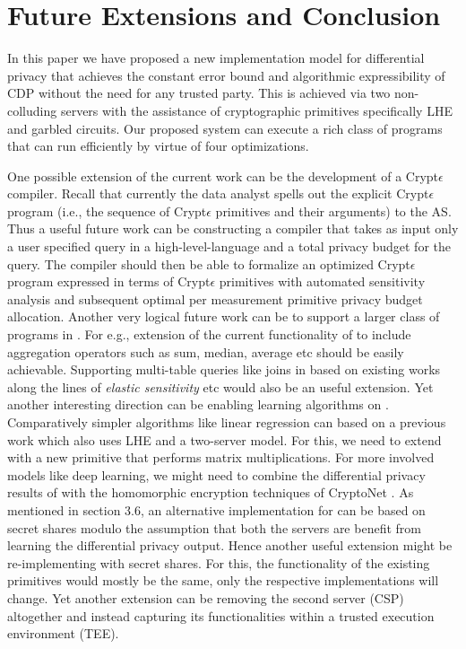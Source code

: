 
\section{Future Extensions and Conclusion}
In this paper we have proposed a new implementation model for differential privacy that achieves the constant error bound and  algorithmic expressibility of \textsf{CDP} without the need for any trusted party. This is achieved via two non-colluding servers with the assistance of cryptographic primitives specifically \textsf{LHE} and garbled circuits. Our proposed system \system can execute a rich class of programs that can run  efficiently by virtue of four optimizations.
\par  One possible extension of the current work can be the development of a
Crypt$\epsilon$ compiler. Recall that currently the data analyst spells out the explicit Crypt$\epsilon$ program  (i.e., the sequence of Crypt$\epsilon$ primitives and their arguments) to the \textsf{AS}. Thus a useful future work can be constructing a compiler that takes as input only a user specified query in a high-level-language and a total privacy budget for the query. The
compiler should then be able to formalize an optimized Crypt$\epsilon$ program expressed in terms of Crypt$\epsilon$ primitives with automated sensitivity analysis and subsequent optimal per measurement primitive privacy budget allocation. 
Another very logical future work can be to support a larger class of programs in \system. For e.g., extension of the current functionality of \system to include aggregation operators such as sum, median, average etc should be easily achievable. Supporting  multi-table queries like joins in \system based on existing works along the lines of \emph{elastic sensitivity} \cite{elastic} etc would also be an useful extension.  Yet another interesting direction can be enabling learning algorithms on \system.   Comparatively simpler algorithms like linear regression can based on a previous work \cite{LReg} which also uses \textsf{LHE} and a two-server model. For this, we need to extend \system with a new primitive that performs matrix multiplications. For more involved models like deep learning, we might need to combine the differential privacy results of \cite{DLDP} with the homomorphic encryption techniques of  CryptoNet \cite{CryptoNet}. As mentioned in section 3.6, an alternative implementation for \system  can be based on secret shares modulo the assumption that both the servers are benefit from learning the differential privacy output. Hence another useful extension might be re-implementing \system with  secret shares. For this, the functionality of the existing primitives would mostly be the same, only the respective implementations will change. 
Yet another extension can be removing the second server (\textsf{CSP}) altogether and instead capturing its functionalities within a trusted execution environment (TEE).
